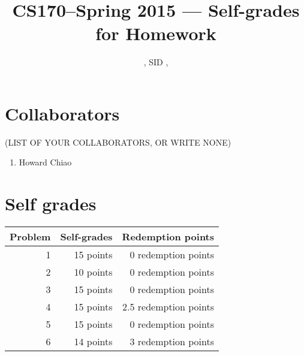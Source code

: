 \documentclass[11pt]{article}
\title{CS170--Spring 2015 --- Self-grades for Homework \Homework}
\author{\Name, SID \SID, \texttt{\Login}}
\date{}
\begin{document}
\maketitle

\section*{Collaborators} 
(LIST OF YOUR COLLABORATORS, OR WRITE NONE)

\begin{enumerate}
\item Howard Chiao
\end{enumerate}



\section*{Self grades}

\begin{table}[h]
\centering
\begin{tabular}{|r|r|r|}
\hline
 Problem & Self-grades & \qquad Redemption points     \\ \hline
1	&	15 points	&  0 redemption points     \\ \hline 
2	&	10 points	& 0 redemption points     \\ \hline 
3	&	15 points	& 0 redemption points     \\ \hline 
4	&	15 points	& 2.5	redemption points     \\ \hline 
5	&	15 points	& 0	redemption points     \\ \hline 
6	&	14 points	& 3	redemption points     \\ \hline 

\end{tabular}
\end{table}


\newpage
\end{document}
